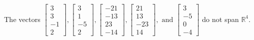 \begin{exercise}
\begin{exerciseStatement}
  \end{exerciseStatement}
  \begin{exerciseAnswer}
   The vectors \(\left[\begin{array}{r}
3 \\
3 \\
-1 \\
2
\end{array}\right] , \left[\begin{array}{r}
3 \\
1 \\
-5 \\
2
\end{array}\right] , \left[\begin{array}{r}
-21 \\
-13 \\
23 \\
-14
\end{array}\right] , \left[\begin{array}{r}
21 \\
13 \\
-23 \\
14
\end{array}\right] , \text{ and } \left[\begin{array}{r}
3 \\
-5 \\
0 \\
-4
\end{array}\right]\) 
  	 do not  
	span \(\mathbb{R}^4\).
  


  \end{exerciseAnswer}
\end{exercise}
